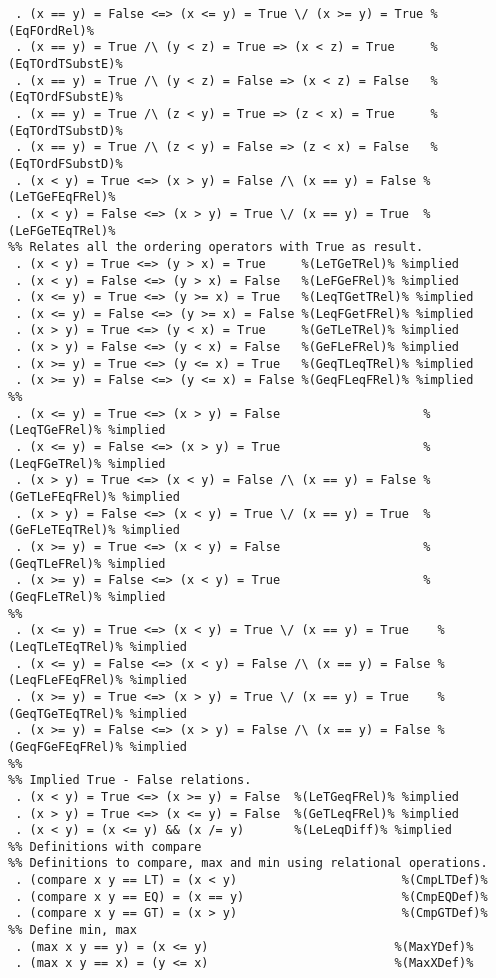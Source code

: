 \begin{Verbatim}
 . (x == y) = False <=> (x <= y) = True \/ (x >= y) = True %(EqFOrdRel)%
 . (x == y) = True /\ (y < z) = True => (x < z) = True     %(EqTOrdTSubstE)%
 . (x == y) = True /\ (y < z) = False => (x < z) = False   %(EqTOrdFSubstE)%
 . (x == y) = True /\ (z < y) = True => (z < x) = True     %(EqTOrdTSubstD)%
 . (x == y) = True /\ (z < y) = False => (z < x) = False   %(EqTOrdFSubstD)%
 . (x < y) = True <=> (x > y) = False /\ (x == y) = False %(LeTGeFEqFRel)%
 . (x < y) = False <=> (x > y) = True \/ (x == y) = True  %(LeFGeTEqTRel)%
%% Relates all the ordering operators with True as result.
 . (x < y) = True <=> (y > x) = True     %(LeTGeTRel)% %implied
 . (x < y) = False <=> (y > x) = False   %(LeFGeFRel)% %implied
 . (x <= y) = True <=> (y >= x) = True   %(LeqTGetTRel)% %implied
 . (x <= y) = False <=> (y >= x) = False %(LeqFGetFRel)% %implied
 . (x > y) = True <=> (y < x) = True     %(GeTLeTRel)% %implied
 . (x > y) = False <=> (y < x) = False   %(GeFLeFRel)% %implied
 . (x >= y) = True <=> (y <= x) = True   %(GeqTLeqTRel)% %implied
 . (x >= y) = False <=> (y <= x) = False %(GeqFLeqFRel)% %implied
%%
 . (x <= y) = True <=> (x > y) = False                    %(LeqTGeFRel)% %implied
 . (x <= y) = False <=> (x > y) = True                    %(LeqFGeTRel)% %implied
 . (x > y) = True <=> (x < y) = False /\ (x == y) = False %(GeTLeFEqFRel)% %implied
 . (x > y) = False <=> (x < y) = True \/ (x == y) = True  %(GeFLeTEqTRel)% %implied
 . (x >= y) = True <=> (x < y) = False                    %(GeqTLeFRel)% %implied
 . (x >= y) = False <=> (x < y) = True                    %(GeqFLeTRel)% %implied
%%
 . (x <= y) = True <=> (x < y) = True \/ (x == y) = True    %(LeqTLeTEqTRel)% %implied
 . (x <= y) = False <=> (x < y) = False /\ (x == y) = False %(LeqFLeFEqFRel)% %implied
 . (x >= y) = True <=> (x > y) = True \/ (x == y) = True    %(GeqTGeTEqTRel)% %implied
 . (x >= y) = False <=> (x > y) = False /\ (x == y) = False %(GeqFGeFEqFRel)% %implied
%%
%% Implied True - False relations.
 . (x < y) = True <=> (x >= y) = False  %(LeTGeqFRel)% %implied
 . (x > y) = True <=> (x <= y) = False  %(GeTLeqFRel)% %implied
 . (x < y) = (x <= y) && (x /= y)       %(LeLeqDiff)% %implied
%% Definitions with compare 
%% Definitions to compare, max and min using relational operations.
 . (compare x y == LT) = (x < y)                       %(CmpLTDef)%
 . (compare x y == EQ) = (x == y)                      %(CmpEQDef)%
 . (compare x y == GT) = (x > y)                       %(CmpGTDef)%
%% Define min, max
 . (max x y == y) = (x <= y)                          %(MaxYDef)%
 . (max x y == x) = (y <= x)                          %(MaxXDef)%

\end{Verbatim}
